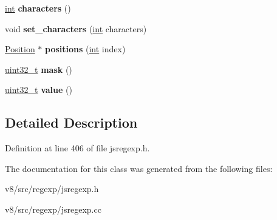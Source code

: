 \begin{DoxyCompactItemize}
\mbox{\hyperlink{classint}{int}} {\bfseries characters} ()
\item 
\mbox{\label{classv8_1_1internal_1_1QuickCheckDetails_ab9efae22271416e09adc1849f4332592}} 
void {\bfseries set\+\_\+characters} (\mbox{\hyperlink{classint}{int}} characters)
\item 
\mbox{\label{classv8_1_1internal_1_1QuickCheckDetails_a3c79e51f163a2d00caee94a651b3056b}} 
\mbox{\hyperlink{structv8_1_1internal_1_1QuickCheckDetails_1_1Position}{Position}} $\ast$ {\bfseries positions} (\mbox{\hyperlink{classint}{int}} index)
\item 
\mbox{\label{classv8_1_1internal_1_1QuickCheckDetails_aee05926b1648f61e6743dab204b35270}} 
\mbox{\hyperlink{classuint32__t}{uint32\+\_\+t}} {\bfseries mask} ()
\item 
\mbox{\label{classv8_1_1internal_1_1QuickCheckDetails_a76dc597450cb0efa662d7a145e41dd4e}} 
\mbox{\hyperlink{classuint32__t}{uint32\+\_\+t}} {\bfseries value} ()
\end{DoxyCompactItemize}


\subsection{Detailed Description}


Definition at line 406 of file jsregexp.\+h.



The documentation for this class was generated from the following files\+:\begin{DoxyCompactItemize}
\item 
v8/src/regexp/jsregexp.\+h\item 
v8/src/regexp/jsregexp.\+cc\end{DoxyCompactItemize}
